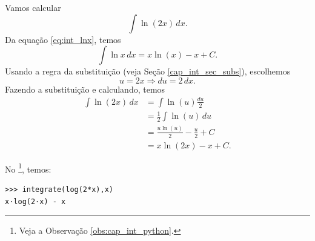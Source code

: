 \begin{ex}
  Vamos calcular
  \begin{equation}
    \int \ln(2x)\,dx.
  \end{equation}
  Da equação \ref{eq:int_lnx}, temos
  \begin{equation}
    \int \ln x\,dx = x\ln(x) - x + C.
  \end{equation}
  Usando a regra da substituição (veja Seção \ref{cap_int_sec_subs}), escolhemos
  \begin{equation}
    u = 2x \Rightarrow du = 2\,dx.
  \end{equation}
  Fazendo a substituição e calculando, temos
  \begin{align}
    \int \ln(2x)\,dx &= \int \ln(u)\frac{du}{2} \\
                     &= \frac{1}{2}\int \ln(u)\,du \\
                     &= \frac{u\ln(u)}{2} - \frac{u}{2} + C \\
                     &= x\ln(2x) - x + C.
  \end{align}

  \ifispython
  No \sympy\footnote{Veja a Observação \ref{obs:cap_int_python}.}, temos:
\begin{verbatim}
>>> integrate(log(2*x),x)
x·log(2·x) - x
\end{verbatim}
  \fi
\end{ex}

